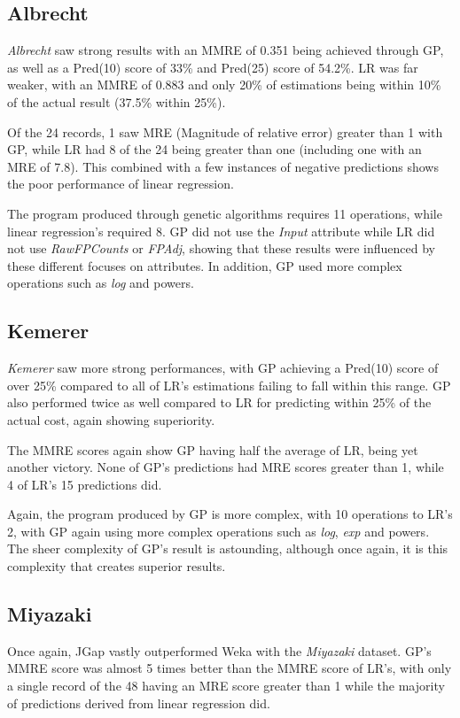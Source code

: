 \documentclass[11pt, a4paper]{article}
\begin{document}
\subsection{Albrecht} %
\label{sub:albrecht_comp}
\emph{Albrecht} saw strong results with an MMRE of 0.351 being achieved through
GP, as well as a Pred(10) score of 33\% and Pred(25) score of 54.2\%. LR was far
weaker, with an MMRE of 0.883 and only 20\% of estimations being within 10\% of
the actual result (37.5\% within 25\%). 

Of the 24 records, 1 saw MRE (Magnitude of relative error) greater than 1 with
GP, while LR had 8 of the 24 being greater than one (including one with an MRE
of 7.8). This combined with a few instances of negative predictions shows the
poor performance of linear regression.

The program produced through genetic algorithms requires 11 operations, while
linear regression's required 8. GP did not use the \emph{Input} attribute while
LR did not use \emph{RawFPCounts} or \emph{FPAdj}, showing that these results
were influenced by these different focuses on attributes. In addition, GP used
more complex operations such as \emph{log} and powers.

\subsection{Kemerer} %
\label{sub:kemerer_comp}
\emph{Kemerer} saw more strong performances, with GP achieving a Pred(10) score
of over 25\% compared to all of LR's estimations failing to fall within this
range. GP also performed twice as well compared to LR for predicting within 25\%
of the actual cost, again showing superiority.

The MMRE scores again show GP having half the average of LR, being yet another
victory. None of GP's predictions had MRE scores greater than 1, while 4 of LR's
15 predictions did.

Again, the program produced by GP is more complex, with 10 operations to LR's 2,
with GP again using more complex operations such as \emph{log}, \emph{exp} and
powers. The sheer complexity of GP's result is astounding, although once again,
it is this complexity that creates superior results.

\subsection{Miyazaki} %
\label{sub:miyazaki_comp}
Once again, JGap vastly outperformed Weka with the \emph{Miyazaki} dataset.
GP's MMRE score was almost 5 times better than the MMRE score of LR's, with only
a single record of the 48 having an MRE score greater than 1 while the majority
of predictions derived from linear regression did.
\end{document}
